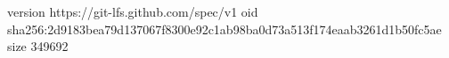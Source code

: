 version https://git-lfs.github.com/spec/v1
oid sha256:2d9183bea79d137067f8300e92c1ab98ba0d73a513f174eaab3261d1b50fc5ae
size 349692
